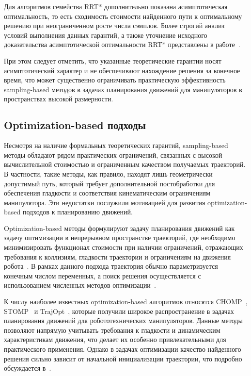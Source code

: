 \documentclass[a4paper,12pt]{extarticle}
\begin{document}
Для алгоритмов семейства RRT* дополнительно показана асимптотическая
оптимальность, то есть сходимость стоимости найденного пути к
оптимальному решению при неограниченном росте числа сэмплов.
Более строгий анализ условий выполнения данных гарантий, а также
уточнение исходного доказательства асимптотической оптимальности
RRT* представлены в работе~\cite{10}.

При этом следует отметить, что указанные теоретические гарантии носят
асимптотический характер и не обеспечивают нахождение решения за
конечное время, что может существенно ограничивать практическую
эффективность sampling-based методов в задачах планирования движений
для манипуляторов в пространствах высокой размерности.

\subsection{Optimization-based подходы}
Несмотря на наличие формальных теоретических гарантий, sampling-based
методы обладают рядом практических ограничений, связанных с высокой вычислительной
стоимостью и ограниченным качеством получаемых траекторий. В
частности, такие методы, как правило, находят лишь геометрически
допустимый путь, который требует дополнительной постобработки для
обеспечения гладкости и соответствия кинематическим ограничениям
манипулятора. Эти недостатки послужили мотивацией для развития
optimization-based подходов к планированию движений.

Optimization-based методы формулируют задачу планирования движений как
задачу оптимизации в непрерывном пространстве траекторий, где
необходимо минимизировать функционал стоимости при наличии
ограничений, отражающих требования к коллизиям, гладкости траектории и
ограничениям на движения робота~\cite{17}. В рамках данного подхода траектория
обычно параметризуется конечным числом переменных, а поиск решения
осуществляется с использованием численных методов
оптимизации~\cite{18}.

К числу наиболее известных optimization-based алгоритмов относятся
CHOMP~\cite{13}, STOMP~\cite{14} и TrajOpt~\cite{15}, которые получили широкое распространение в
задачах планирования движений для робототехнических манипуляторов.
Данные методы позволяют напрямую учитывать требования к гладкости и
динамическим характеристикам движения, что делает их особенно
привлекательными для практического применения. Однако в задачах оптимизации
качество найденного решения сильно зависит от начальной инициализации
траектории, что подробно обсуждается в~\cite{16}.
\end{document}

